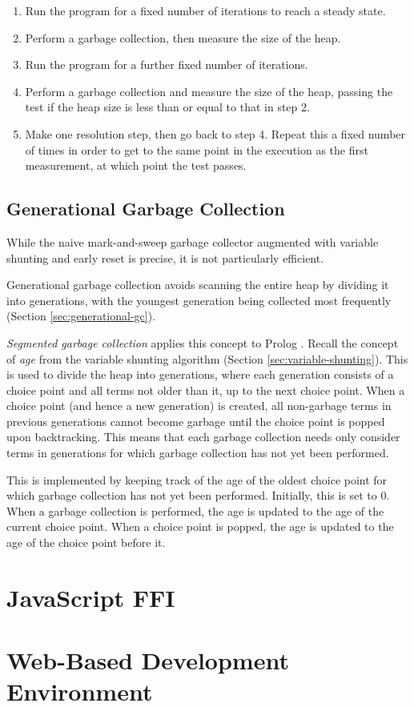 \begin{enumerate}
\item Run the program for a fixed number of iterations to reach a steady state.
\item Perform a garbage collection, then measure the size of the heap.
\item Run the program for a further fixed number of iterations.
\item Perform a garbage collection and measure the size of the heap, passing the test if the heap size is less than or equal to that in step 2.
\item Make one resolution step, then go back to step 4. Repeat this a fixed number of times in order to get to the same point in the execution as the first measurement, at which point the test passes.
\end{enumerate}

\subsection{Generational Garbage Collection}

\label{sec:implementation-generational-gc}

While the naive mark-and-sweep garbage collector augmented with variable shunting and early reset is precise, it is not particularly efficient.

Generational garbage collection avoids scanning the entire heap by dividing it into generations, with the youngest generation being collected most frequently (Section \ref{sec:generational-gc}).

\emph{Segmented garbage collection} applies this concept to Prolog \cite{applebyGarbargecollectionProlog1988}. Recall the concept of \emph{age} from the variable shunting algorithm (Section \ref{sec:variable-shunting}). This is used to divide the heap into generations, where each generation consists of a choice point and all terms not older than it, up to the next choice point. When a choice point (and hence a new generation) is created, all non-garbage terms in previous generations cannot become garbage until the choice point is popped upon backtracking. This means that each garbage collection needs only consider terms in generations for which garbage collection has not yet been performed.

This is implemented by keeping track of the age of the oldest choice point for which garbage collection has not yet been performed. Initially, this is set to 0. When a garbage collection is performed, the age is updated to the age of the current choice point. When a choice point is popped, the age is updated to the age of the choice point before it.

\section{JavaScript FFI}

\label{sec:js-ffi}

\section{Web-Based Development Environment}